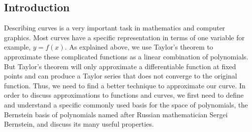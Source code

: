 \documentclass{article}
\begin{document}
\subsection{Introduction}
Describing curves is a very important task in mathematics and computer graphics. Most curves have a specific  representation in terms of one variable for example, $y = f(x)$. As explained above, we use Taylor’s theorem to approximate these complicated functions as a linear combination of polynomials. But Taylor’s theorem will only approximate a differentiable function at fixed points and can produce a Taylor series that does not converge to the original function. Thus, we need to find a better technique to approximate our curve.
In order to discuss approximations to functions and curves, we first need to define and understand a specific commonly used basis for the space of polynomials, the Bernstein basis of polynomials named after Russian mathematician Sergei Bernstein, and discuss its many useful properties.
\end{document}
